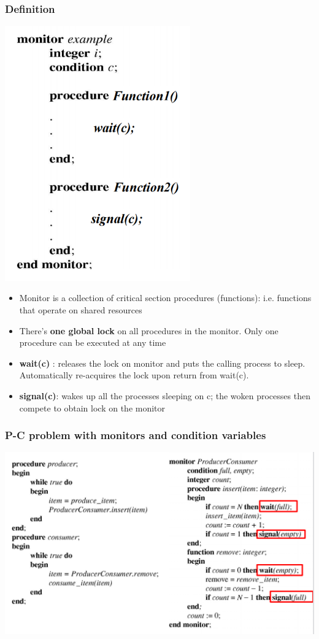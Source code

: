 \documentclass[12pt]{article}
\begin{document}
\subsubsection{Definition}
\includegraphics[width=0.6\textwidth]{Monitor.png}
\begin{itemize}
    \item Monitor is a collection of critical section procedures (functions): i.e. functions that operate on shared resources 
    \item There’s {\bfseries one global lock} on all procedures in the monitor. Only one procedure can be executed at any time
    \item {\bfseries wait(c)} : releases the lock on monitor and puts the calling process to sleep. Automatically re-acquires the lock upon return from wait(c). 
    \item {\bfseries signal(c)}: wakes up all the processes sleeping on c; the woken processes then compete to obtain lock on the monitor
\end{itemize}
\subsubsection{P-C problem with monitors and condition variables}
\includegraphics[width=\textwidth]{PCProblemMonitor.png}
\end{document}
